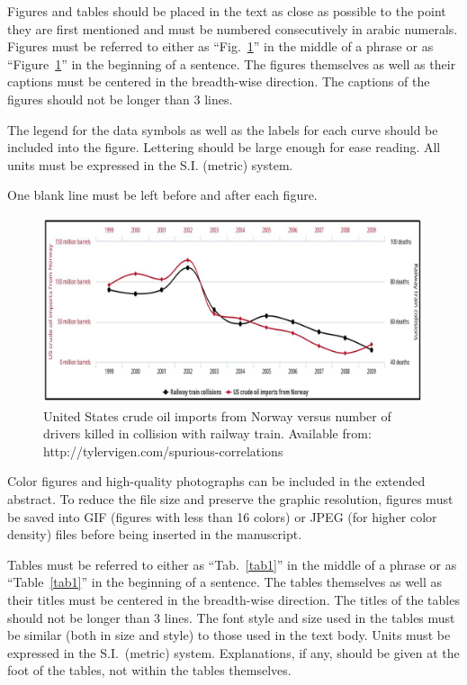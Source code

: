 Figures and tables should be placed in the text as close as possible to the point they are first mentioned and must be numbered consecutively in arabic numerals. Figures must be referred to either as ``Fig.~\ref{fig1}'' in the middle of a phrase or as ``Figure~\ref{fig1}'' in the beginning of a sentence. The figures themselves as well as their captions must be centered in the breadth-wise direction. The captions of the figures should not be longer than 3 lines.

The legend for the data symbols as well as the labels for each curve should be included into the figure. Lettering should be large enough for ease reading. All units must be expressed in the S.I. (metric) system.

One blank line must be left before and after each figure.

\begin{figure}[h!]
\centering
\includegraphics[angle=0, scale=0.320]{figure.jpeg}
\caption{United States crude oil imports from Norway versus number of drivers killed in collision with railway train. Available from: http://tylervigen.com/spurious-correlations}
\label{fig1}
\end{figure}

Color figures and high-quality photographs can be included in the extended abstract. To reduce the file size and preserve the graphic resolution, figures must be saved into GIF (figures with less than 16 colors) or JPEG (for higher color density) files before being inserted in the manuscript.

Tables must be referred to either as ``Tab.~\ref{tab1}'' in the middle of a phrase or as ``Table~\ref{tab1}'' in the beginning of a sentence.  The tables themselves as well as their titles must be centered in the breadth-wise direction. The titles of the tables should not be longer than 3 lines. The font style and size used in the tables must be similar (both in size and style) to those used in the text body. Units must be expressed in the S.I.\ (metric) system. Explanations, if any, should be given at the foot of the tables, not within the tables themselves.

